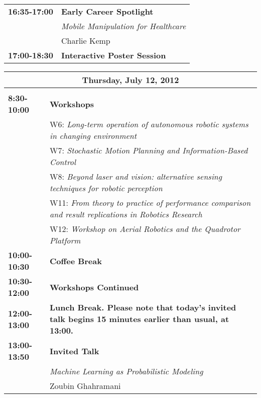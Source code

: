 \begin{tabular}{lp{13.8cm}}
{\bf 16:35-17:00} & {\bf Early Career Spotlight} \\[2mm]
& \em{Mobile Manipulation for Healthcare}\\
& Charlie Kemp\\[2mm]

{\bf 17:00-18:30} & {\bf Interactive Poster Session} \\[2mm]
\end{tabular}





\newpage
\begin{tabular}{lp{13.8cm}}
\hline
\multicolumn{2}{|c|}{{\bf Thursday, July 12, 2012}}\\
\hline\\
{\bf 8:30-10:00} & {\bf Workshops} \\[2mm]
& W6: {\em Long-term operation of autonomous robotic systems in changing environment}\\
& W7: {\em Stochastic Motion Planning and Information-Based Control}\\
& W8: {\em Beyond laser and vision: alternative sensing techniques for robotic perception}\\
& W11: {\em From theory to practice of performance comparison and result replications in Robotics Research}\\
& W12: {\em Workshop on Aerial Robotics and the Quadrotor Platform} \\[2mm]

{\bf 10:00-10:30} & {\bf Coffee Break} \\[4mm]

{\bf 10:30-12:00} & {\bf Workshops Continued} \\[4mm]

{\bf 12:00-13:00} & {\bf Lunch Break. Please note that today's invited talk begins 15 minutes earlier than usual, at 13:00.} \\[4mm]

{\bf 13:00-13:50} & {\bf Invited Talk} \\[2mm]
& \em{ Machine Learning as Probabilistic Modeling}\\
& Zoubin Ghahramani\\[2mm]


\end{tabular}
